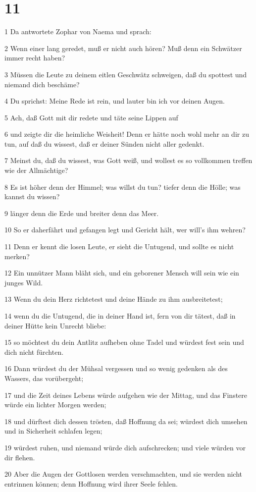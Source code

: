 \chapter{11}

\par 1 Da antwortete Zophar von Naema und sprach:
\par 2 Wenn einer lang geredet, muß er nicht auch hören? Muß denn ein Schwätzer immer recht haben?
\par 3 Müssen die Leute zu deinem eitlen Geschwätz schweigen, daß du spottest und niemand dich beschäme?
\par 4 Du sprichst: Meine Rede ist rein, und lauter bin ich vor deinen Augen.
\par 5 Ach, daß Gott mit dir redete und täte seine Lippen auf
\par 6 und zeigte dir die heimliche Weisheit! Denn er hätte noch wohl mehr an dir zu tun, auf daß du wissest, daß er deiner Sünden nicht aller gedenkt.
\par 7 Meinst du, daß du wissest, was Gott weiß, und wollest es so vollkommen treffen wie der Allmächtige?
\par 8 Es ist höher denn der Himmel; was willst du tun? tiefer denn die Hölle; was kannst du wissen?
\par 9 länger denn die Erde und breiter denn das Meer.
\par 10 So er daherfährt und gefangen legt und Gericht hält, wer will's ihm wehren?
\par 11 Denn er kennt die losen Leute, er sieht die Untugend, und sollte es nicht merken?
\par 12 Ein unnützer Mann bläht sich, und ein geborener Mensch will sein wie ein junges Wild.
\par 13 Wenn du dein Herz richtetest und deine Hände zu ihm ausbreitetest;
\par 14 wenn du die Untugend, die in deiner Hand ist, fern von dir tätest, daß in deiner Hütte kein Unrecht bliebe:
\par 15 so möchtest du dein Antlitz aufheben ohne Tadel und würdest fest sein und dich nicht fürchten.
\par 16 Dann würdest du der Mühsal vergessen und so wenig gedenken als des Wassers, das vorübergeht;
\par 17 und die Zeit deines Lebens würde aufgehen wie der Mittag, und das Finstere würde ein lichter Morgen werden;
\par 18 und dürftest dich dessen trösten, daß Hoffnung da sei; würdest dich umsehen und in Sicherheit schlafen legen;
\par 19 würdest ruhen, und niemand würde dich aufschrecken; und viele würden vor dir flehen.
\par 20 Aber die Augen der Gottlosen werden verschmachten, und sie werden nicht entrinnen können; denn Hoffnung wird ihrer Seele fehlen.


